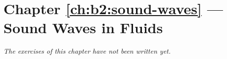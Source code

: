 \section*{Chapter \ref{ch:b2:sound-waves} --- Sound Waves in Fluids}


\emph{The exercises of this chapter have not been written yet.}
